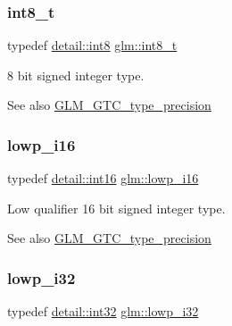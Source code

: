 \subsubsection{\texorpdfstring{int8\+\_\+t}{int8\_t}}
{\footnotesize\ttfamily typedef \hyperlink{namespaceglm_1_1detail_a04b526a8d7a9b455602a0afa78c531e0}{detail\+::int8} \hyperlink{group__gtc__type__precision_ga673898d450b2a91186f3c4f40c5f8633}{glm\+::int8\+\_\+t}}

8 bit signed integer type. \begin{DoxySeeAlso}{See also}
\hyperlink{group__gtc__type__precision}{G\+L\+M\+\_\+\+G\+T\+C\+\_\+type\+\_\+precision} 
\end{DoxySeeAlso}
\mbox{\label{group__gtc__type__precision_gaf7bbfd31bcec25a416ea94d09efb5451}} 
\subsubsection{\texorpdfstring{lowp\+\_\+i16}{lowp\_i16}}
{\footnotesize\ttfamily typedef \hyperlink{namespaceglm_1_1detail_a375938874ca4f0a0982ec6373b56117b}{detail\+::int16} \hyperlink{group__gtc__type__precision_gaf7bbfd31bcec25a416ea94d09efb5451}{glm\+::lowp\+\_\+i16}}

Low qualifier 16 bit signed integer type. \begin{DoxySeeAlso}{See also}
\hyperlink{group__gtc__type__precision}{G\+L\+M\+\_\+\+G\+T\+C\+\_\+type\+\_\+precision} 
\end{DoxySeeAlso}
\mbox{\label{group__gtc__type__precision_ga70fd34e8b8cffc92739161284ed77328}} 
\subsubsection{\texorpdfstring{lowp\+\_\+i32}{lowp\_i32}}
{\footnotesize\ttfamily typedef \hyperlink{namespaceglm_1_1detail_a9f85b4efeca416cdcec2fd08939a2e17}{detail\+::int32} \hyperlink{group__gtc__type__precision_ga70fd34e8b8cffc92739161284ed77328}{glm\+::lowp\+\_\+i32}}

